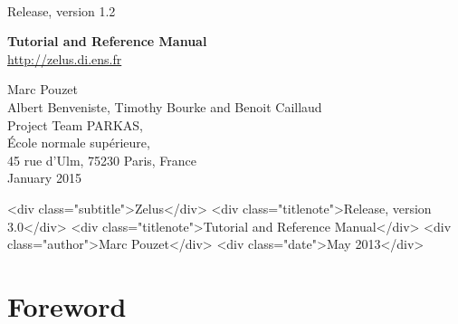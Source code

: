 \documentclass[11pt,titlepage,twoside]{report}
\begin{document}
\pagestyle{empty}

\begin{latexonly}
\vfill

\\[2ex]
{\Large Release, version 1.2}


\vspace{7cm}

\begin{center}
{\Huge \bf Tutorial and Reference Manual} \\

\vspace{1cm}
{\Large \url{http://zelus.di.ens.fr}}
\vspace{1.5cm}

{\Large Marc Pouzet} \\[2ex]
{\Large Albert Benveniste, Timothy Bourke and Benoit Caillaud} \\[4ex]
{\large Project Team PARKAS, \\
\'Ecole normale sup\'erieure, \\ 45 rue d'Ulm,
75230 Paris, France} \\[2ex]
{\Large January 2015} \\

\end{center}
\end{latexonly}
\begin{rawhtml}
  <div class="subtitle">Zelus</div>
  <div class="titlenote">Release, version 3.0</div>
  <div class="titlenote">Tutorial and Reference Manual</div>
  <div class="author">Marc Pouzet</div>
  <div class="date">May 2013</div>
\end{rawhtml}


\newpage
\cleardoublepage
\tableofcontents
\cleardoublepage

\newcommand{\Left}{\mathit{left}}
\newcommand{\Right}{\mathit{right}}

\chapter*{Foreword} %
\end{document}
